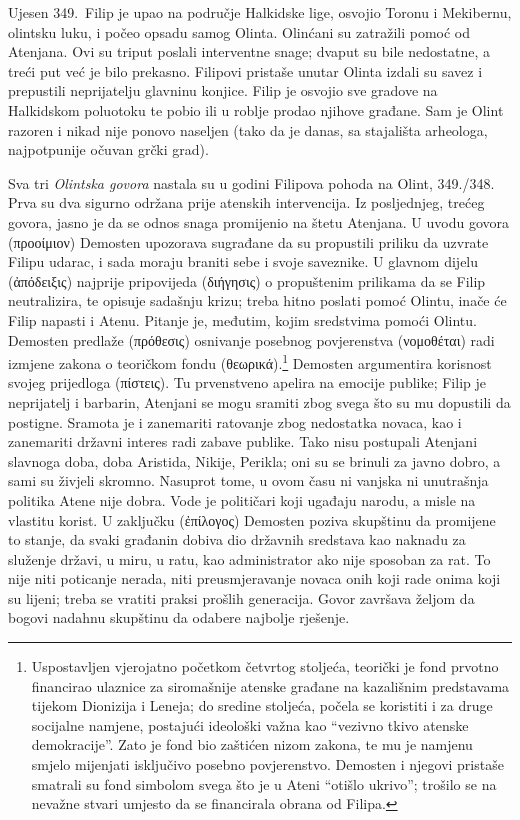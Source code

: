 Ujesen 349.\ Filip je upao na područje Halkidske lige, osvojio Toronu i Mekibernu, olintsku luku, i počeo opsadu samog Olinta. Olinćani su zatražili pomoć od Atenjana. Ovi su triput poslali interventne snage; dvaput su bile nedostatne, a treći put već je bilo prekasno. Filipovi pristaše unutar Olinta izdali su savez i prepustili neprijatelju glavninu konjice. Filip je osvojio sve gradove na Halkidskom poluotoku te pobio ili u roblje prodao njihove građane. Sam je Olint razoren i nikad nije ponovo naseljen (tako da je danas, sa stajališta arheologa, najpotpunije očuvan grčki grad).

Sva tri \textit{Olintska govora} nastala su u godini Filipova pohoda na Olint, 349./348. Prva su dva sigurno održana prije atenskih intervencija. Iz posljednjeg, trećeg govora, jasno je da se odnos snaga promijenio na štetu Atenjana. U uvodu govora \textgreek[variant=ancient]{(προοίμιον)} Demosten upozorava sugrađane da su propustili priliku da uzvrate Filipu udarac, i sada moraju braniti sebe i svoje saveznike. U glavnom dijelu \textgreek[variant=ancient]{(ἀπόδειξις)} najprije pripovijeda  \textgreek[variant=ancient]{(διήγησις)} o propuštenim prilikama da se Filip neutralizira, te opisuje sadašnju krizu; treba hitno poslati pomoć Olintu, inače će Filip napasti i Atenu. Pitanje je, međutim, kojim sredstvima pomoći Olintu. Demosten predlaže \textgreek[variant=ancient]{(πρόθεσις)} osnivanje posebnog povjerenstva \textgreek[variant=ancient]{(νομοθέται)} radi izmjene zakona o teoričkom fondu \textgreek[variant=ancient]{(θεωρικά).}\footnote{Uspostavljen vjerojatno početkom četvrtog stoljeća, teorički je fond prvotno financirao ulaznice za siromašnije atenske građane na kazališnim predstavama tijekom Dionizija i Leneja; do sredine stoljeća, počela se koristiti i za druge socijalne namjene, postajući ideološki važna kao ``vezivno tkivo atenske demokracije''. Zato je fond bio zaštićen nizom zakona, te mu je namjenu smjelo mijenjati isključivo posebno povjerenstvo. Demosten i njegovi pristaše smatrali su fond simbolom svega što je u Ateni ``otišlo ukrivo''; trošilo se na nevažne stvari umjesto da se financirala obrana od Filipa.} Demosten argumentira korisnost svojeg prijedloga (πίστεις). Tu prvenstveno apelira na emocije publike; Filip je neprijatelj i barbarin, Atenjani se mogu sramiti zbog svega što su mu dopustili da postigne. Sramota je i zanemariti ratovanje zbog nedostatka novaca, kao i zanemariti državni interes radi zabave publike. Tako nisu postupali Atenjani slavnoga doba, doba Aristida, Nikije, Perikla; oni su se brinuli za javno dobro, a sami su živjeli skromno. Nasuprot tome, u ovom času ni vanjska ni unutrašnja politika Atene nije dobra. Vode je političari koji ugađaju narodu, a misle na vlastitu korist. U zaključku (ἐπίλογος) Demosten poziva skupštinu da promijene to stanje, da svaki građanin dobiva dio državnih sredstava kao naknadu za služenje državi, u miru, u ratu, kao administrator ako nije sposoban za rat. To nije niti poticanje nerada, niti preusmjeravanje novaca onih koji rade onima koji su lijeni; treba se vratiti praksi prošlih generacija. Govor završava željom da bogovi nadahnu skupštinu da odabere najbolje rješenje.

